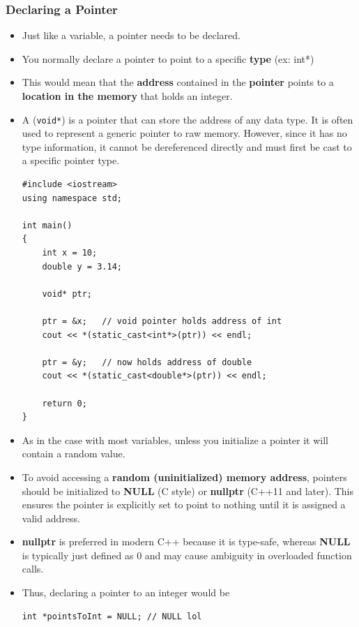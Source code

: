 \documentclass[10pt]{article}
\newcommand{\pbreak}{\vspace{30pt}}
\newcommand{\vocab}[1]{\fbox{\textbf{\textit{#1}}}}
\begin{document}
\subsubsection{Declaring a Pointer}
\begin{itemize}
	\item Just like a variable, a pointer needs to be declared.
	\item You normally declare a pointer to point to a specific \textbf{type} (ex: int*)
	\item This would mean that the \textbf{address} contained in the \textbf{pointer} points to a \textbf{location in the memory} that holds an integer.
\item A \vocab{void pointer} (\verb|void*|) is a pointer that can store the address of any data type. It is often used to represent a generic pointer to raw memory. However, since it has no type information, it cannot be dereferenced directly and must first be cast to a specific pointer type.

	\begin{verbatim}
#include <iostream>
using namespace std;

int main()
{
    int x = 10;
    double y = 3.14;

    void* ptr;

    ptr = &x;   // void pointer holds address of int
    cout << *(static_cast<int*>(ptr)) << endl;

    ptr = &y;   // now holds address of double
    cout << *(static_cast<double*>(ptr)) << endl;

    return 0;
}
	\end{verbatim}


	\pbreak

\item As in the case with most variables, unless you initialize a pointer it will contain a random value.
\item To avoid accessing a \textbf{random (uninitialized) memory address}, pointers should be initialized to \textbf{NULL} (C style) or \textbf{nullptr} (C++11 and later). This ensures the pointer is explicitly set to point to nothing until it is assigned a valid address.

	\item \textbf{nullptr} is preferred in modern C++ because it is type-safe, whereas \textbf{NULL} is typically just defined as 0 and may cause ambiguity in overloaded function calls.
	
	\item Thus, declaring a pointer to an integer would be

		\begin{verbatim}
int *pointsToInt = NULL; // NULL lol
		\end{verbatim}

\end{itemize}
\end{document}
